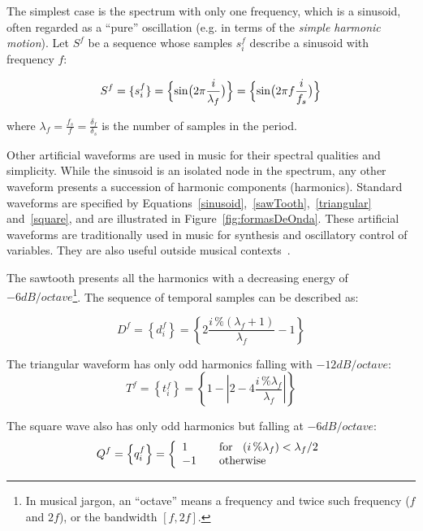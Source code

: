 The simplest case is the spectrum with only one frequency, which is a sinusoid, often regarded as a ``pure'' oscillation (e.g. in terms of the \emph{simple harmonic motion}).
Let $S^f$ be a sequence whose samples $s_i^f$ describe a sinusoid with frequency $f$:

\begin{equation}\label{sinusoid}
     S^f=\{ s^f_i \}=\Bigl\{ \sin\bigl(2\pi \frac{i}{\lambda_f} \bigr)  \Bigr\} = \Bigl\{ \sin\bigl(2\pi f \frac{i}{f_s}\bigr)  \Bigr\} 
\end{equation}

\noindent where $\lambda_f=\frac{f_s}{f}=\frac{\delta_f}{\delta_s}$ is the number of samples in the period.

Other artificial waveforms are used in music for their spectral qualities and simplicity.
While the sinusoid is an isolated node in the spectrum, any other waveform presents a succession of harmonic components (harmonics).
Standard waveforms are specified by Equations~\ref{sinusoid},~\ref{sawTooth},~\ref{triangular} and~\ref{square}, and are illustrated in Figure~\ref{fig:formasDeOnda}.
These artificial waveforms are traditionally used in music for synthesis and oscillatory control of variables. They are also useful outside musical contexts~\cite{Openheim}.

The sawtooth presents all the harmonics with a decreasing energy of $-6dB/octave$\footnote{In 
musical jargon, an ``octave'' means a frequency and twice such frequency ($f$ and $2f$), or the bandwidth $[f,2f]$.}.
The sequence of temporal samples can be described as:

\begin{equation}\label{sawTooth}
	D^f=\left\{ d^f_i \right\}=\left\{ 2\frac{i\,\%(\lambda_f+1)}{\lambda_f} -1 \right\}
\end{equation}

The triangular waveform has only odd harmonics falling with $-12dB/octave$:
\begin{equation}\label{triangular}
     T^f=\left\{ t^f_i \right\}=\left\{1- \left| 2 - 4\frac{i\,\%\lambda_f}{\lambda_f} \right| \right\}
\end{equation}

The square wave also has only odd harmonics but falling at $-6dB/octave$:
\begin{equation}\label{square}
     Q^f=\left\{ q^f_i \right\}= \left\{
         \begin{array}{l l}
              1 & \quad \text{for } \; \; (i\,\%\lambda_f)   <  \lambda_f /2  \\
              -1 & \quad \text{otherwise}\\
         \end{array} \right.
\end{equation}

